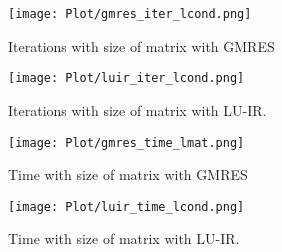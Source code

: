 \begin{figure}[ht]
     \begin{minipage}[b]{0.5\linewidth}
        \centering
   \texttt{[image: Plot/gmres\_iter\_lcond.png]}
        \caption{Iterations with size of matrix with GMRES}
        \label{fig:image21}
    \end{minipage}
    \hspace{0.5cm} 
    \begin{minipage}[b]{0.5\linewidth}
        \centering
        \texttt{[image: Plot/luir\_iter\_lcond.png]}
        \caption{Iterations with size of matrix with LU-IR.}
        \label{fig:image22}
    \end{minipage}
\end{figure}
\newpage
\begin{figure}[ht]
     \begin{minipage}[b]{0.5\linewidth}
        \centering
   \texttt{[image: Plot/gmres\_time\_lmat.png]}
        \caption{Time with size of matrix with GMRES}
        \label{fig:image23}
    \end{minipage}
    \hspace{0.5cm} 
    \begin{minipage}[b]{0.5\linewidth}
        \centering
        \texttt{[image: Plot/luir\_time\_lcond.png]}
        \caption{Time with size of matrix with LU-IR.}
        \label{fig:image24}
    \end{minipage}
\end{figure}
\clearpage